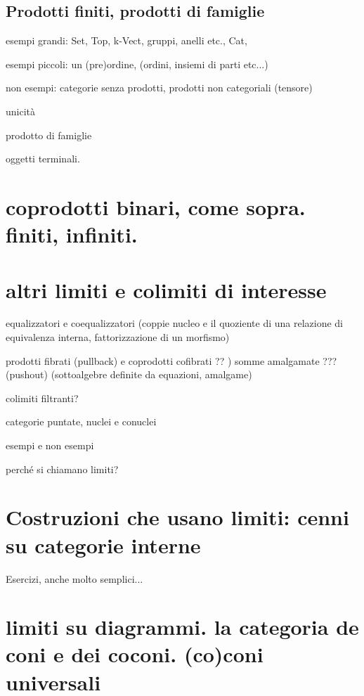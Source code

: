 \subsection{Prodotti finiti, prodotti di famiglie}


\begin{esercizi}
\item 	
\end{esercizi}

\bigskip
esempi grandi: Set, Top, k-Vect, gruppi, anelli etc., Cat, 

esempi piccoli: un (pre)ordine, (ordini, insiemi di parti etc...) 

non esempi: categorie senza prodotti, prodotti non categoriali (tensore)

unicità

prodotto di famiglie

oggetti terminali.

\section{coprodotti binari, come sopra. finiti, infiniti.}

\section{altri limiti e colimiti di interesse}

equalizzatori e coequalizzatori (coppie nucleo e il quoziente di una relazione di equivalenza interna, fattorizzazione di un morfismo)

prodotti fibrati (pullback) e coprodotti cofibrati ?? ) somme amalgamate ??? (pushout) (sottoalgebre definite da equazioni, amalgame) 

colimiti filtranti?

categorie puntate, nuclei e conuclei

esempi e non esempi

perché si chiamano limiti?


\section{Costruzioni che usano limiti: cenni su categorie interne}

Esercizi, anche molto semplici...

\section{limiti su diagrammi. la categoria de coni e dei coconi. (co)coni universali}

